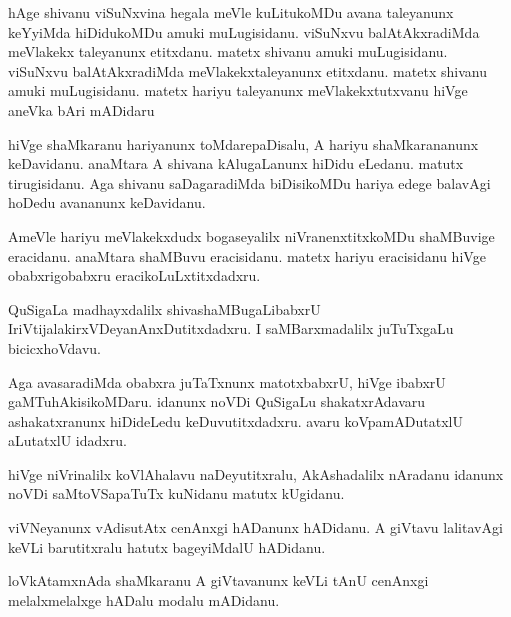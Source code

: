 \documentclass{article}
\begin{document}
\begin{mn}
hAge  shivanu  viSuNxvina  hegala  meVle  kuLitukoMDu  avana  taleyanunx  keYyiMda  hiDidukoMDu  amuki  
muLugisidanu.  viSuNxvu  balAtAkxradiMda  meVlakekx  taleyanunx  etitxdanu.  matetx  shivanu  amuki  
muLugisidanu.  viSuNxvu  balAtAkxradiMda  meVlakekxtaleyanunx  etitxdanu.  matetx  shivanu  amuki  
muLugisidanu.  matetx  hariyu  taleyanunx  meVlakekxtutxvanu  hiVge  aneVka  bAri  mADidaru
\end{mn}

\begin{mn}
hiVge  shaMkaranu  hariyanunx  toMdarepaDisalu,  A  hariyu  shaMkarananunx  keDavidanu.  anaMtara  A  
shivana  kAlugaLanunx  hiDidu  eLedanu.  matutx  tirugisidanu.  Aga  shivanu  saDagaradiMda  
biDisikoMDu  hariya  edege  balavAgi  hoDedu  avananunx  keDavidanu.
\end{mn}

\begin{mn}
AmeVle  hariyu  meVlakekxdudx  bogaseyalilx  niVranenxtitxkoMDu  shaMBuvige  eracidanu.  anaMtara  
shaMBuvu  eracisidanu.  matetx  hariyu  eracisidanu  hiVge  obabxrigobabxru  eracikoLuLxtitxdadxru.
\end{mn}

\begin{mn}
QuSigaLa  madhayxdalilx  shivashaMBugaLibabxrU  IriVtijalakirxVDeyanAnxDutitxdadxru.  I  saMBarxmadalilx  
juTuTxgaLu  bicicxhoVdavu.
\end{mn}

\begin{mn}
Aga  avasaradiMda  obabxra  juTaTxnunx  matotxbabxrU,  hiVge  ibabxrU  gaMTuhAkisikoMDaru.  idanunx  noVDi  
QuSigaLu  shakatxrAdavaru  ashakatxranunx  hiDideLedu  keDuvutitxdadxru.  avaru  koVpamADutatxlU  aLutatxlU  idadxru.
\end{mn}

\begin{mn}
hiVge  niVrinalilx  koVlAhalavu  naDeyutitxralu,  AkAshadalilx  nAradanu  idanunx  noVDi  saMtoVSapaTuTx  
kuNidanu  matutx  kUgidanu.
\end{mn}

\begin{mn}
viVNeyanunx  vAdisutAtx  cenAnxgi  hADanunx  hADidanu.  A  giVtavu  lalitavAgi  keVLi  barutitxralu  
hatutx  bageyiMdalU  hADidanu.
\end{mn}

\begin{mn}
loVkAtamxnAda  shaMkaranu  A  giVtavanunx  keVLi  tAnU  cenAnxgi  melalxmelalxge  hADalu  modalu  mADidanu.
\end{mn}
\end{document}
